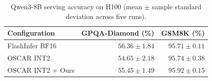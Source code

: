 \begin{table}[t]
  \centering
  \caption{Qwen3-8B serving accuracy on H100 (mean $\pm$ sample standard deviation across five runs).}
  \label{tab:serving-accuracy}
  \footnotesize
  \setlength{\tabcolsep}{4pt}
  \begin{tabular}{@{}lrr@{}}
    \toprule
    Configuration & GPQA-Diamond (\%) & GSM8K (\%) \\
    \midrule
    FlashInfer BF16 & $56.36 \pm 1.84$ & $95.71 \pm 0.11$ \\
    OSCAR INT2 & $54.65 \pm 2.18$ & $95.74 \pm 0.38$ \\
    OSCAR INT2 + Ours & $55.45 \pm 1.49$ & $95.92 \pm 0.15$ \\
    \bottomrule
  \end{tabular}
\end{table}
